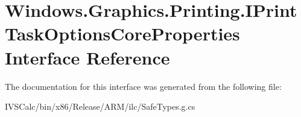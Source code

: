\hypertarget{interface_windows_1_1_graphics_1_1_printing_1_1_i_print_task_options_core_properties}{}\section{Windows.\+Graphics.\+Printing.\+I\+Print\+Task\+Options\+Core\+Properties Interface Reference}
\label{interface_windows_1_1_graphics_1_1_printing_1_1_i_print_task_options_core_properties}


The documentation for this interface was generated from the following file\+:\begin{DoxyCompactItemize}
\item 
I\+V\+S\+Calc/bin/x86/\+Release/\+A\+R\+M/ilc/Safe\+Types.\+g.\+cs\end{DoxyCompactItemize}
